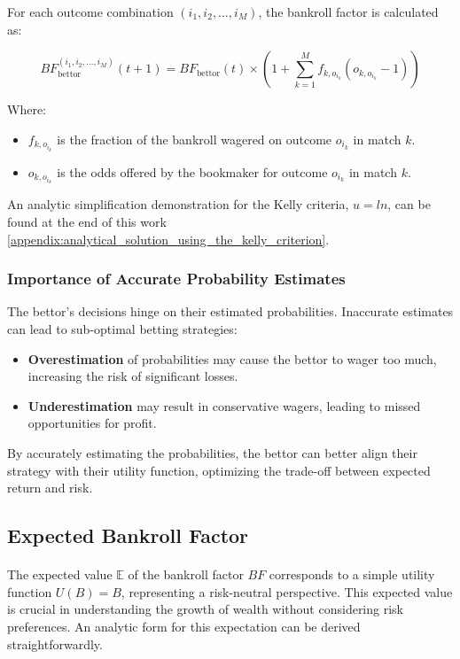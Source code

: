 For each outcome combination \( (i_1, i_2, \dots, i_M) \), the bankroll factor is calculated as:

\[
BF_{\text{bettor}}^{(i_1, i_2, \dots, i_M)}(t+1) = BF_{\text{bettor}}(t) \times \left( 1 + \sum_{k=1}^{M} f_{k,o_{i_k}} \left( o_{k,o_{i_k}} - 1 \right) \right)
\]

Where:

\begin{itemize}
    \item \( f_{k,o_{i_k}} \) is the fraction of the bankroll wagered on outcome \( o_{i_k} \) in match \( k \).
    \item \( o_{k,o_{i_k}} \) is the odds offered by the bookmaker for outcome \( o_{i_k} \) in match \( k \).
\end{itemize}

An analytic simplification demonstration for the Kelly criteria, \(u = ln\), can be found at the end of this work \ref{appendix:analytical_solution_using_the_kelly_criterion}.

\subsubsection{Importance of Accurate Probability Estimates}

The bettor's decisions hinge on their estimated probabilities. Inaccurate estimates can lead to sub-optimal betting strategies:

\begin{itemize}
     \item\textbf{Overestimation} of probabilities may cause the bettor to wager too much, increasing the risk of significant losses.
    \item \textbf{Underestimation} may result in conservative wagers, leading to missed opportunities for profit.
\end{itemize}

By accurately estimating the probabilities, the bettor can better align their strategy with their utility function, optimizing the trade-off between expected return and risk.


\subsection{Expected Bankroll Factor}

\paragraph{}
The expected value \( \mathbb{E} \) of the bankroll factor \( BF \) corresponds to a simple utility function \( U(B) = B \), representing a risk-neutral perspective. This expected value is crucial in understanding the growth of wealth without considering risk preferences. An analytic form for this expectation can be derived straightforwardly.


